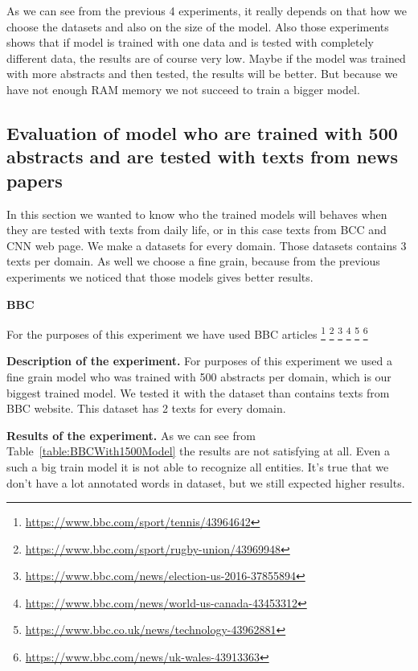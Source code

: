 \documentclass[thesis=M,english]{FITthesis}[2018/05/30]
\begin{document}
	
	As we can see from the previous 4 experiments, it really depends on that how we choose the datasets and also on the size of the model. Also those experiments shows that if model is trained with one data and is tested with completely different data, the results are of course very low. Maybe if the model was trained with more abstracts and then tested, the results will be better. But because we have not enough RAM memory we  not succeed to train a bigger model.
\subsection{Evaluation of model who are trained with 500 abstracts and are tested with texts from news papers}\label{NewsPapersEvaluation}
In this section we wanted to know who the trained models will behaves when they are tested with texts from daily life, or in this case texts from BCC and CNN web page. We make a datasets for every domain. Those datasets contains 3 texts per domain. As well we choose a fine grain, because from the previous experiments we noticed that those models gives better results.


\textbf{BBC}

For the purposes of this experiment we have used BBC articles \footnote{\url{https://www.bbc.com/sport/tennis/43964642}} \footnote{\url{https://www.bbc.com/sport/rugby-union/43969948}} \footnote{\url{https://www.bbc.com/news/election-us-2016-37855894}} \footnote{\url{https://www.bbc.com/news/world-us-canada-43453312}} \footnote{\url{https://www.bbc.co.uk/news/technology-43962881}} \footnote{\url{https://www.bbc.com/news/uk-wales-43913363}}
 
\textbf{Description of the experiment.} For purposes of this experiment we used a fine grain model who was trained with 500 abstracts per domain, which is our biggest trained model. We tested it with the dataset than contains texts from BBC website. This dataset has 2 texts for every domain.

\textbf{Results of the experiment.} As we can see from Table~\ref{table:BBCWith1500Model} the results are not satisfying at all. Even a such a big train model it is not able to recognize all entities. It's true that we don't have a lot annotated words in dataset, but we still expected higher results.
\end{document}
